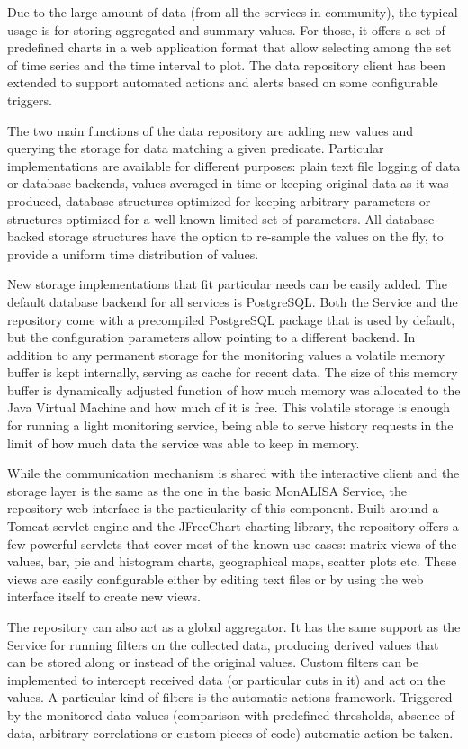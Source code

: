 Due to the large amount of data (from all the services in community), the
typical usage is for storing aggregated and summary values. For those, it
offers a set of predefined charts in a web application format that allow
selecting among the set of time series and the time interval to plot. The data
repository client has been extended to support automated actions and alerts
based on some configurable triggers.

The two main functions of the data repository are adding new values and
querying the storage for data matching a given predicate. Particular
implementations are available for different purposes: plain text file logging
of data or database backends, values averaged in time or keeping original data
as it was produced, database structures optimized for keeping arbitrary
parameters or structures optimized for a well-known limited set of parameters.
All database-backed storage structures have the option to re-sample the values
on the fly, to provide a uniform time distribution of values.

New storage implementations that fit particular needs can be easily added. The
default database backend for all services is PostgreSQL. Both the Service and
the repository come with a precompiled PostgreSQL package that is used by
default, but the configuration parameters allow pointing to a different
backend. In addition to any permanent storage for the monitoring values a
volatile memory buffer is kept internally, serving as cache for recent data.
The size of this memory buffer is dynamically adjusted function of how much
memory was allocated to the Java Virtual Machine and how much of it is free.
This volatile storage is enough for running a light monitoring service, being
able to serve history requests in the limit of how much data the service was
able to keep in memory.

While the communication mechanism is shared with the interactive client and
the storage layer is the same as the one in the basic MonALISA Service, the
repository web interface is the particularity of this component. Built around
a Tomcat servlet engine and the JFreeChart charting library, the repository
offers a few powerful servlets that cover most of the known use cases: matrix
views of the values, bar, pie and histogram charts, geographical maps, scatter
plots etc. These views are easily configurable either by editing text files or
by using the web interface itself to create new views.

The repository can also act as a global aggregator. It has the same support as
the Service for running filters on the collected data, producing derived
values that can be stored along or instead of the original values. Custom
filters can be implemented to intercept received data (or particular cuts in
it) and act on the values. A particular kind of filters is the automatic
actions framework. Triggered by the monitored data values (comparison with
predefined thresholds, absence of data, arbitrary correlations or custom
pieces of code) automatic action be taken.


